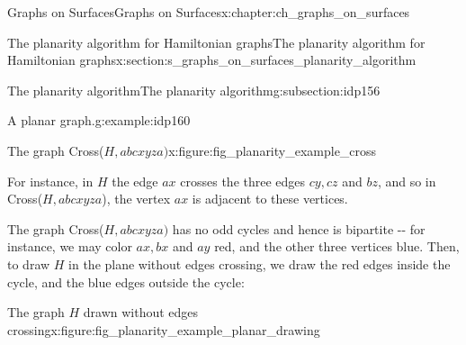 \documentclass[oneside,10pt,]{book}
\numberwithin{equation}{section}
\begin{document}
\begin{chapterptx}{Graphs on Surfaces}{}{Graphs on Surfaces}{}{}{x:chapter:ch_graphs_on_surfaces}
\begin{sectionptx}{The planarity algorithm for Hamiltonian graphs}{}{The planarity algorithm for Hamiltonian graphs}{}{}{x:section:s_graphs_on_surfaces_planarity_algorithm}
\begin{subsectionptx}{The planarity algorithm}{}{The planarity algorithm}{}{}{g:subsection:idp156}
\begin{example}{A planar graph.}{g:example:idp160}
\begin{figureptx}{The graph Cross(\(H, abcxyza)\)}{x:figure:fig_planarity_example_cross}{}
\begin{image}{0.15}{0.7}{0.15}
{
}%
\end{image}%
\tcblower
\end{figureptx}%
For instance, in \(H\) the edge \(ax\) crosses the three edges \(cy, cz\) and \(bz\), and so in Cross(\(H, abcxyza\)), the vertex \(ax\) is adjacent to these vertices.%
\par
The graph Cross(\(H, abcxyza)\) has no odd cycles and hence is bipartite -{}-{} for instance, we may color \(ax, bx\) and \(ay\) red, and the other three vertices blue.  Then, to draw \(H\) in the plane without edges crossing, we draw the red edges inside the cycle, and the blue edges outside the cycle:%
\begin{figureptx}{The graph \(H\) drawn without edges crossing}{x:figure:fig_planarity_example_planar_drawing}{}%
\begin{image}{0.15}{0.7}{0.15}%
\end{image}
\end{figureptx}
\end{example}
\end{subsectionptx}
\end{sectionptx}
\end{chapterptx}
\end{document}
